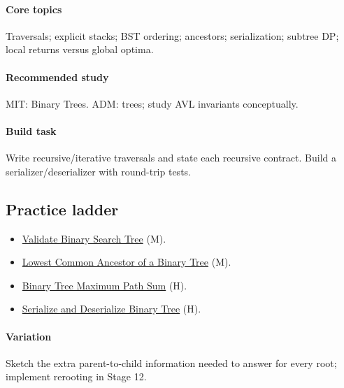 \documentclass[11pt,letterpaper]{article}
\begin{document}
\paragraph*{Core topics}

Traversals; explicit stacks; BST ordering; ancestors; serialization; subtree DP; local returns versus global optima.

\paragraph*{Recommended study}

MIT: Binary Trees. ADM: trees; study AVL invariants conceptually.

\paragraph*{Build task}

Write recursive/iterative traversals and state each recursive contract. Build a serializer/deserializer with round-trip tests.

\subsection*{Practice ladder}

\begin{itemize}

\item \href{https://leetcode.com/problems/validate-binary-search-tree/}{Validate Binary Search Tree} (M).

\item \href{https://leetcode.com/problems/lowest-common-ancestor-of-a-binary-tree/}{Lowest Common Ancestor of a Binary Tree} (M).

\item \href{https://leetcode.com/problems/binary-tree-maximum-path-sum/}{Binary Tree Maximum Path Sum} (H).

\item \href{https://leetcode.com/problems/serialize-and-deserialize-binary-tree/}{Serialize and Deserialize Binary Tree} (H).

\end{itemize}

\paragraph*{Variation}

Sketch the extra parent-to-child information needed to answer for every root; implement rerooting in Stage 12.
\end{document}
